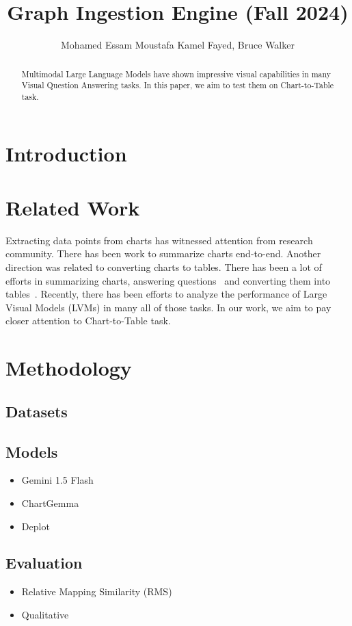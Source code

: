 \documentclass[
	letterpaper, %
]{jdf}
\author{Mohamed Essam Moustafa Kamel Fayed, Bruce Walker}
\title{Graph Ingestion Engine (Fall 2024)}
\begin{document}

\maketitle

\begin{abstract}
Multimodal     Large Language Models have shown impressive visual capabilities in many Visual Question Answering tasks.
In this paper, we aim to test them on Chart-to-Table task.
     \end{abstract}

     \tableofcontents

\section{Introduction}
\section{Related Work}
Extracting data points from charts has witnessed attention from research community.
There has been work to summarize charts end-to-end.
Another direction was related to converting charts to tables.
There has been a lot of efforts in summarizing charts, answering questions~\cite{masry2022chartqa,masry2024chartgemma} and converting them into tables~\cite{liu2022deplot}.
Recently, there has been efforts to analyze the performance of Large Visual Models (LVMs) in many all of those tasks.
In our work, we aim to pay closer attention to Chart-to-Table task.
\section{Methodology}\label{sect:methodology}
\subsection{Datasets}
\subsection{Models}
\begin{itemize}
         \item Gemini 1.5 Flash
         \item ChartGemma
         \item Deplot
              \end{itemize}
\subsection{Evaluation}
\begin{itemize}
    \item Relative Mapping Similarity (RMS)
    \item Qualitative
              \end{itemize}
\end{document}

